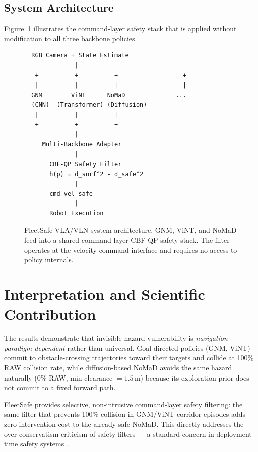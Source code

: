 \documentclass[12pt,a4paper]{article}
\begin{document}
\FloatBarrier
\subsection{System Architecture}

Figure~\ref{fig:arch} illustrates the command-layer safety stack that is
applied without modification to all three backbone policies.

\begin{figure}[htbp]
\centering
\small
\begin{verbatim}
  RGB Camera + State Estimate
              |
   +----------+----------+------------------+
   |          |          |                  |
  GNM        ViNT      NoMaD              ...
  (CNN)  (Transformer) (Diffusion)
   |          |          |
   +----------+----------+
              |
     Multi-Backbone Adapter
              |
       CBF-QP Safety Filter
       h(p) = d_surf^2 - d_safe^2
              |
       cmd_vel_safe
              |
       Robot Execution
\end{verbatim}
\caption{FleetSafe-VLA/VLN system architecture. GNM, ViNT, and NoMaD feed into
         a shared command-layer CBF-QP safety stack. The filter operates at the
         velocity-command interface and requires no access to policy internals.}
\label{fig:arch}
\end{figure}

\section{Interpretation and Scientific Contribution}
\label{sec:contribution}

The results demonstrate that invisible-hazard vulnerability is
\emph{navigation-paradigm-dependent} rather than universal. Goal-directed
policies (GNM, ViNT) commit to obstacle-crossing trajectories toward their
targets and collide at 100\% RAW collision rate, while diffusion-based NoMaD
avoids the same hazard naturally (0\% RAW, min clearance $= 1.5$\,m) because
its exploration prior does not commit to a fixed forward path.

FleetSafe provides selective, non-intrusive command-layer safety filtering:
the same filter that prevents 100\% collision in GNM/ViNT corridor episodes
adds zero intervention cost to the already-safe NoMaD. This directly addresses
the over-conservatism criticism of safety filters
--- a standard concern in deployment-time safety systems~\cite{brunke2022safe}.
\end{document}
